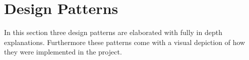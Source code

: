 \documentclass[a4paper,11pt]{article}
\begin{document}
\begin{minipage}{\linewidth}
\end{minipage}
\section{Design Patterns \\}
In this section three design patterns are elaborated with fully in depth explanations. Furthermore these patterns come with a visual depiction of how they were implemented in the project. \\

\end{document}
